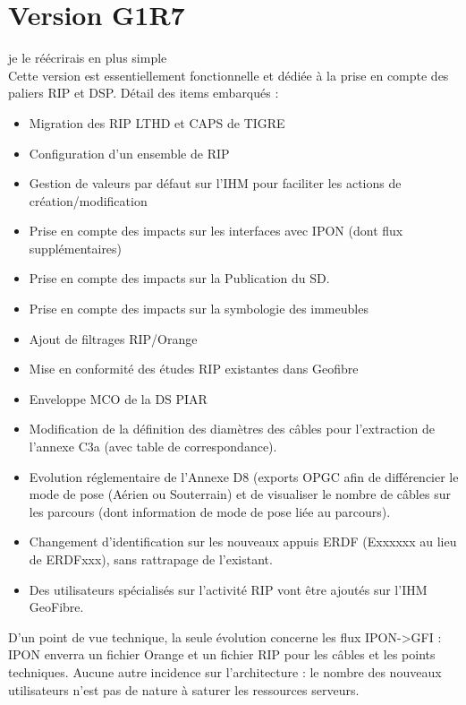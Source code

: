 \section{Version G1R7}
je le réécrirais en plus simple\\
Cette version est essentiellement  fonctionnelle et dédiée à la prise en compte des paliers RIP et DSP.
Détail des items embarqués :
\begin{itemize}
\item Migration des RIP LTHD et CAPS de TIGRE
\item Configuration d’un ensemble de RIP
\item Gestion de valeurs par défaut sur l’IHM pour faciliter les actions de création/modification
\item Prise en compte des impacts sur les interfaces avec IPON (dont flux supplémentaires)
\item Prise en compte des impacts sur la Publication du SD.
\item Prise en compte des impacts sur la symbologie des immeubles
\item Ajout de filtrages RIP/Orange
\item Mise en conformité des études RIP existantes dans Geofibre
\item	Enveloppe MCO de la DS PIAR
\item Modification de la définition des diamètres des câbles pour l'extraction de l'annexe C3a (avec table de correspondance).
\item Evolution réglementaire de l’Annexe D8 (exports OPGC afin de différencier le mode de pose (Aérien ou Souterrain) et de visualiser le nombre de câbles sur les parcours (dont information de mode de pose liée au parcours).
\item Changement d’identification sur les nouveaux appuis ERDF (Exxxxxx au lieu de ERDFxxx), sans rattrapage de l’existant.
\item Des utilisateurs spécialisés sur l’activité RIP vont être ajoutés sur l’IHM GeoFibre.
\end{itemize}
D’un point de vue technique, la seule évolution concerne les flux IPON->GFI : IPON enverra un fichier Orange et un fichier RIP pour les câbles et les points techniques.
Aucune autre incidence sur l’architecture : le nombre des  nouveaux utilisateurs n’est pas de nature à saturer les ressources serveurs.

